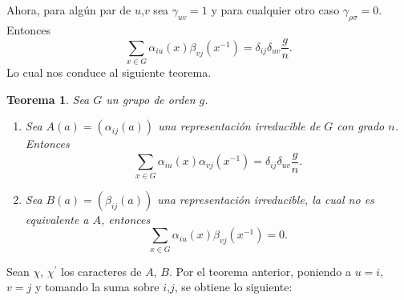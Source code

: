 \documentclass[12pt]{book}
\newtheorem{theorem}{Teorema}[section]
\theoremstyle{definition}
\newcounter{in}
\begin{document}
Ahora, para algún par de $u$,$v$ sea $\gamma_{uv}=1$ y para cualquier otro caso $\gamma_{\rho \sigma}=0$. Entonces
\begin{equation}
  \label{eq:31}
  \sum_{x \in G} \alpha_{iu}(x) \beta_{vj}(x^{-1}) = \delta_{ij} \delta_{uv}\frac{g}{n}.
\end{equation}
Lo cual nos conduce al siguiente teorema.

\begin{theorem}
  \label{t4_3}
  Sea $G$ un grupo de orden $g$.
  \begin{enumerate}
  \item Sea $A(a)=(\alpha_{ij}(a))$ una representación irreducible de
    $G$ con grado $n$. Entonces
    \begin{equation*}
      \sum_{x \in G} \alpha_{iu}(x) \alpha_{vj}(x^{-1})
      = \delta_{ij} \delta_{uv}\frac{g}{n}.
    \end{equation*}
  \item Sea $ B(a)=(\beta_{ij}(a))$ una representación irreducible, la
    cual no es equivalente a $A$, entonces
    \begin{equation*}
      \sum_{x \in G} \alpha_{iu}(x) \beta_{vj}(x^{-1}) =0.
    \end{equation*}
    \end{enumerate}
\end{theorem}
Sean $\chi$, $\chi^{'}$ los caracteres de $A$, $B$. Por el teorema
anterior, poniendo a $u=i$, $v=j$ y tomando la suma sobre $i$,$j$, se
obtiene lo siguiente:
\end{document}
